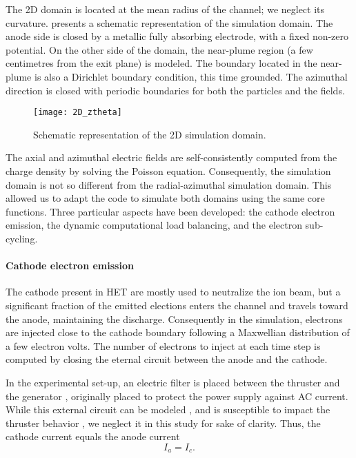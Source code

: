 The \ac{2D} \ztheta domain is located at the mean radius of the channel\string; we neglect its curvature.
 presents a schematic representation of the \ztheta simulation domain.
The anode side is closed by a metallic fully absorbing electrode, with a fixed non-zero potential.
On the other side of the domain, the near-plume region (a few centimetres from the exit plane) is modeled.
The boundary located in the near-plume is also a Dirichlet boundary condition, this time grounded.
The azimuthal direction is closed with periodic boundaries for both the particles and the fields.

\begin{figure}[hbt]
  \centering
  \texttt{[image: 2D\_ztheta]}
  \caption{Schematic representation of the \ac{2D} \ztheta simulation domain.}
  \label{fig-2D_ztheta_bis}
\end{figure}

The axial and azimuthal electric fields are self-consistently computed from the charge density by solving the Poisson equation.
Consequently, the simulation domain is not so different from the radial-azimuthal simulation domain.
This allowed us to adapt the code \LPPic to simulate both domains using the same core functions.
Three particular aspects have been developed\string: the cathode electron emission, the dynamic computational load balancing, and the electron sub-cycling.

\paragraph{Cathode electron emission\\}
The cathode present in \ac{HET} are mostly used to neutralize the ion beam, but a significant fraction of the emitted elections enters the channel and travels toward the anode, maintaining the discharge.
Consequently in the simulation, electrons are injected close to the cathode boundary following a Maxwellian distribution of a few electron volts.
The number of electrons to inject at each time step is computed by closing the eternal circuit between the anode and the cathode.

In the experimental set-up, an electric filter is placed between the thruster and the generator \citep{barral2008}, originally placed to protect the power supply against AC current.
While this external circuit can be modeled \citep{verboncoeur1993}, and is susceptible to impact the thruster behavior \citep{barral2008,wei2017}, we neglect it in this study for sake of clarity.
Thus, the cathode current equals the anode current \[ I_a = I_c. \]


